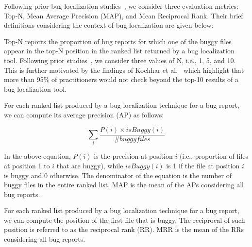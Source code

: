 
Following prior bug localization studies~\cite{SahaLKP13,SahaLKP14,zhou2012should,huo2016learning}, we consider three evaluation metrics: Top-N, Mean Average Precision (MAP), and Mean Reciprocal Rank. Their brief definitions considering the context of bug localization are given below:

\vspace{0.2cm} Top-N reports the proportion of bug reports for which one of the buggy files appear in the top-N position in the ranked list returned by a bug localization tool. Following prior studies~\cite{SahaLKP13,SahaLKP14,zhou2012should,huo2016learning}, we consider three values of N, i.e., 1, 5, and 10. This is further motivated by the findings of Kochhar et al.~\cite{KochharXLL16} which highlight that more than 95\% of practitioners would not check beyond the top-10 results of a bug localization tool.

\vspace{0.2cm} For each ranked list produced by a bug localization technique for a bug report, we can compute its average precision (AP) as follows:

\begin{equation}
\sum_{i} \frac{P(i)\times isBuggy(i)}{\# buggy files}
\end{equation}

In the above equation, $\mathit{P(i)}$ is the precision at position $i$ (i.e., proportion of files at position 1 to $i$ that are buggy), while $\mathit{isBuggy(i)}$ is 1 if the file at position $i$ is buggy and 0 otherwise. The denominator of the equation is the number of buggy files in the entire ranked list. MAP is the mean of the APs considering all bug reports.

\vspace{0.2cm} For each ranked list produced by a bug localization technique for a bug report, we can compute the position of the first file that is buggy. The reciprocal of such position is referred to as the reciprocal rank (RR). MRR is the mean of the RRs considering all bug reports.

